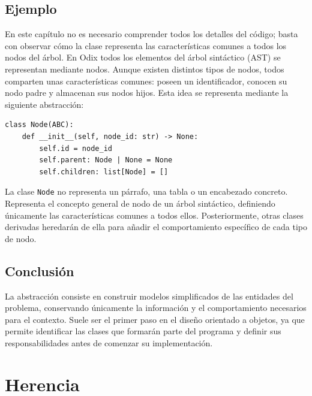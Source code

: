 \documentclass[11pt,a5paper,twoside]{book}
\begin{document}
\subsection{Ejemplo}
En este capítulo no es necesario comprender todos los detalles del código; basta con observar cómo la clase representa las características comunes a todos los nodos del árbol.
En Odix todos los elementos del árbol sintáctico (AST) se representan mediante nodos. Aunque existen distintos tipos de nodos, todos comparten unas características comunes: poseen un identificador, conocen su nodo padre y almacenan sus nodos hijos.
Esta idea se representa mediante la siguiente abstracción:


\begin{tcolorbox}
\scriptsize
 \begin{verbatim}
class Node(ABC):
    def __init__(self, node_id: str) -> None:
        self.id = node_id
        self.parent: Node | None = None
        self.children: list[Node] = []
\end{verbatim}
\end{tcolorbox}
La clase {\scriptsize \texttt{Node}} no representa un párrafo, una tabla o un encabezado concreto. Representa el concepto general de nodo de un árbol sintáctico, definiendo únicamente las características comunes a todos ellos.
Posteriormente, otras clases derivadas heredarán de ella para añadir el comportamiento específico de cada tipo de nodo.
\subsection{Conclusión}
La abstracción consiste en construir modelos simplificados de las entidades del problema, conservando únicamente la información y el comportamiento necesarios para el contexto. Suele ser el primer paso en el diseño orientado a objetos, ya que permite identificar las clases que formarán parte del programa y definir sus responsabilidades antes de comenzar su implementación.

\newpage

\section{Herencia}
\end{document}
